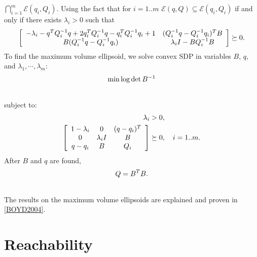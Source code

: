 \documentclass[letterpaper,10pt,english]{sphinxmanual}
\begin{document}
$\bigcap_{i=1}^m{\mathcal E}(q_i,Q_i)$. Using the fact that for
$i=1..m$ ${\mathcal E}(q,Q)\subseteq{\mathcal E}(q_i,Q_i)$
if and only if there exists $\lambda_i>0$ such that
\begin{gather}
\begin{split}\left[\begin{array}{cc}
-\lambda_i - q^TQ_i^{-1}q + 2q_i^TQ_i^{-1}q - q_i^TQ_i^{-1}q_i + 1 & (Q_i^{-1}q-Q_i^{-1}q_i)^TB\\
B(Q_i^{-1}q-Q_i^{-1}q_i) & \lambda_iI-BQ_i^{-1}B\end{array}\right] \succeq 0.\end{split}\notag
\end{gather}
To find the maximum volume ellipsoid, we solve convex SDP in variables
$B$, $q$, and $\lambda_1,\cdots,\lambda_m$:
\begin{gather}
\begin{split}\min \log \det B^{-1}\end{split}\notag\\\begin{split}\end{split}\notag
\end{gather}
subject to:
\begin{gather}
\begin{split}\begin{aligned}
\lambda_i & >  0, \\
\left[\begin{array}{ccc}
1-\lambda_i & 0 & (q - q_i)^T\\
0 & \lambda_iI & B\\
q - q_i & B & Q_i\end{array}\right] & \succeq  0, ~~~ i=1..m.\end{aligned}\end{split}\notag
\end{gather}
After $B$ and $q$ are found,
\begin{gather}
\begin{split}Q = B^TB.\end{split}\notag\\\begin{split}\end{split}\notag
\end{gather}
The results on the maximum volume ellipsoids are explained and proven in
{\hyperref[main_source:boyd2004]{{[}BOYD2004{]}}}.


\chapter{Reachability}
\label{main_source:reachability}
\end{document}
